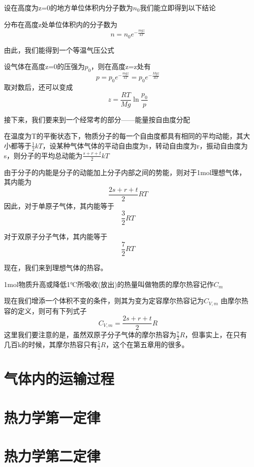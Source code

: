 \documentclass[lang=cn,10pt]{elegantbook}
\begin{document}
	设在高度为z=0的地方单位体积内分子数为$n_{0}$我们能立即得到以下结论
	\begin{conclusion}
		分布在高度z处单位体积内的分子数为
		\begin{equation*}
			n=n_{0}e^{-\frac{mgz}{kT}}
		\end{equation*}
	\end{conclusion}
	
	由此，我们能得到一个等温气压公式
	\begin{theorem}[等温气压公式]
		设气体在高度z=0的压强为$p_{0}$，则在高度z=z处有
		\begin{equation*}
			p=p_{0}e^{-\frac{mgz}{kT}}=p_{0}e^{-\frac{Mgz}{RT}}
		\end{equation*}
		取对数后，还可以变成
		\begin{equation*}
			z=\frac{RT}{Mg}\ln \frac{p_0}{p}
		\end{equation*}
	\end{theorem}
	
	接下来，我们要来到一个经常考的部分——能量按自由度分配
	
	\begin{theorem}[能均分定理]
		在温度为T的平衡状态下，物质分子的每一个自由度都具有相同的平均动能，其大小都等于$\frac{1}{2}kT$，设某种气体气体的平动自由度为t，转动自由度为r，振动自由度为s，则分子的平均总动能为$\frac{s+r+t}{2}kT$
	\end{theorem}
	
	由于分子的内能是分子的动能加上分子内部之间的势能，则对于1mol理想气体，其内能为
	\begin{equation*}
		\frac{2s+r+t}{2}RT
	\end{equation*}
	因此，对于单原子气体，其内能等于
	\begin{equation*}
		\frac{3}{2}RT
	\end{equation*}
	
	对于双原子分子气体，其内能等于
	 \begin{equation*}
	 	\frac{7}{2}RT
	 \end{equation*}
	 
	 现在，我们来到理想气体的热容。
	 
	 \begin{definition}[摩尔热容]
	 	1mol物质升高或降低1$℃$所吸收(放出)的热量叫做物质的摩尔热容记作$C_{m}$
	 \end{definition}
	 现在我们增添一个体积不变的条件，则其为变为定容摩尔热容记为$C_{V,m}$
	 由摩尔热容的定义，则可有下列式子
	 \begin{equation*}
	 	C_{V,m}=\frac{2s+r+t}{2}R
	 \end{equation*}
	 这里我们要注意的是，虽然双原子分子气体的摩尔热容为$\frac{7}{2}R $，但事实上，在只有几百k的时候，其摩尔热容只有$\frac{5}{2}R$，这个在第五章用的很多。
	\chapter{气体内的运输过程}
	\chapter{热力学第一定律}
	\chapter{热力学第二定律}
	
	
\end{document}
